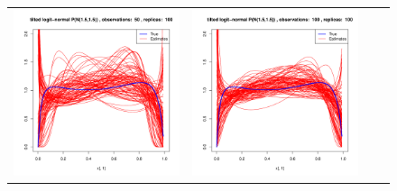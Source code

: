 \begin{figure}[h]
\begin{tabular}{cccc}

	\includegraphics[width=\textwidth/4]{../img/logitnormal/tilted/K1/densities/n50_R100.pdf}
	&
	\includegraphics[width=\textwidth/4]{../img/logitnormal/tilted/K1/densities/n100_R100.pdf}

\end{tabular}
\end{figure}
